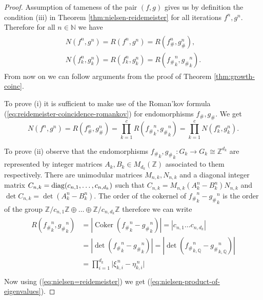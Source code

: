 \documentclass[12pt, a4paper]{amsart}
\def\Z{{\mathbb Z}}
\def\Q{{\mathbb Q}}
\def\Coker{\operatorname{Coker}}
\def\diag{\mathop{\rm diag}\nolimits}
\def\N{{\mathbb N}}
\begin{document}
\begin{proof}
  Assumption of tameness of the pair $(f,g)$ gives us by definition
  the condition (iii) in Theorem \ref{thm:nielsen-reidemeister} for all iterations $f^n, g^n$.
  Therefore for all $n \in \N$ we have
  \begin{gather}\label{eq:nielsen=reidemeister}
  \begin{gathered}
    N(f^n, g^n) = R(f^n, g^n) = R(f_\#^n, g_\#^n), \\
    N(f_k^n, g_k^n) = R(f_k^n, g_k^n) = R({f_\#}_k^n, {g_\#}_k^n).
  \end{gathered}
  \end{gather}
  From now on we can follow arguments from the proof of Theorem \ref{thm:growth-coinc}.

  To prove (i) it is sufficient to make use of the Roman'kov formula (\ref{eq:reidemeister-coincidence-romankov})
  for endomorphisms $f_\#, g_\#$. We get
  \[
    N(f^n, g^n) = R(f_\#^n, g_\#^n)
    = \prod_{k=1}^c R({f_\#}_k^n, {g_\#}_k^n) = \prod_{k=1}^c N(f_k^n, g_k^n).
  \]

  To prove (ii) observe that the endomorphisms ${f_\#}_k, {g_\#}_k: G_k \to G_k \cong \Z^{d_k}$
  are represented by integer matrices $A_k, B_k \in M_{d_k}(\Z)$ associated to them respectively.
  There are unimodular matrices $M_{n,k}, N_{n,k}$ and a diagonal integer matrix
  $C_{n,k} = \diag(c_{n,1},\dots,c_{n,d_k})$
  such that $C_{n,k} = M_{n,k}(A_k^n - B_k^n)N_{n,k}$ and $\det C_{n,k} = \det(A_k^n - B_k^n)$.
  The order of the cokernel of ${f_\#}_k^n - {g_\#}_k^n$ is the order of the group
  $\Z/c_{n,1}\Z \oplus \dots \oplus \Z/c_{n,d_k}\Z$ therefore we can write
  \begin{align}
  \begin{split}
    R({f_\#}_k^n, {g_\#}_k^n) &= |\Coker({f_\#}_k^n - {g_\#}_k^n)| = |c_{n,1} \dots c_{n,d_k}| \\
    &= |\det({f_\#}_k^n - {g_\#}_k^n)| = |\det({f_\#}_{k,\Q}^n - {g_\#}_{k,\Q}^n)| \\
    &= \prod_{i=1}^{d_k} \lvert \xi_{k,i}^{\, n} - \eta_{k,i}^{\, n} \rvert \\
  \end{split}
  \end{align}
  Now using (\ref{eq:nielsen=reidemeister}) we get (\ref{eq:nielsen-product-of-eigenvalues}).


\end{proof}
\end{document}
